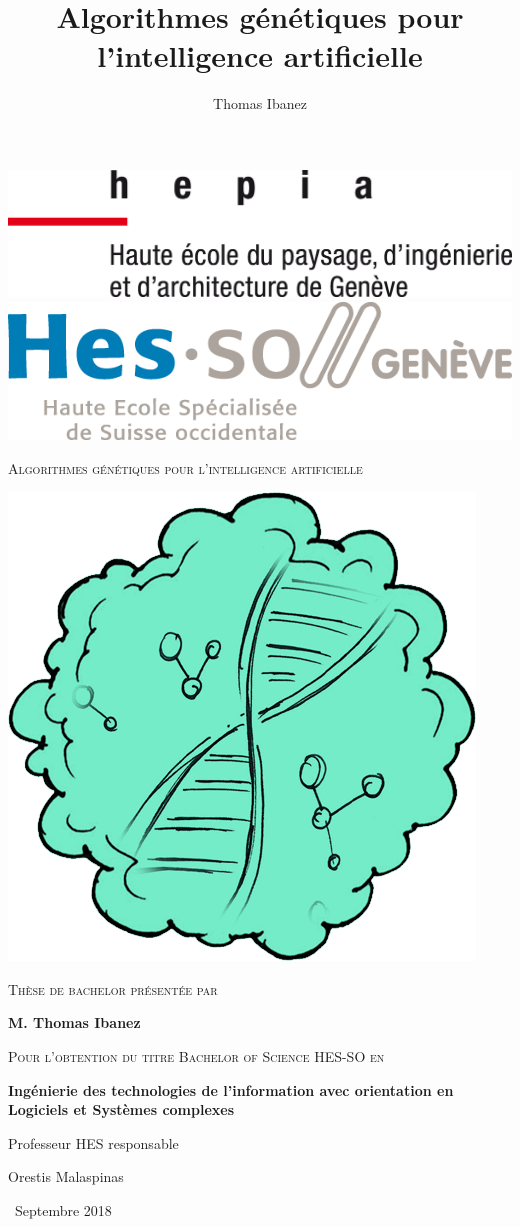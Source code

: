 \documentclass{article}
\title{Algorithmes génétiques pour l'intelligence artificielle}
\author{Thomas Ibanez}
\begin{document}
\begin{titlepage}
	\vspace*{-3cm}
		\includegraphics[width=.3\linewidth]{hepia.png}
		\hfill
		\includegraphics[width=.3\linewidth]{hes.png}\par
	\vspace{1cm}
	\centering
	{\scshape\huge Algorithmes génétiques pour l'intelligence artificielle \par}
	\vspace{1cm}
	\includegraphics[scale=0.4]{logo.png}\par
	\vspace{1.5cm}
	{\Large\scshape Thèse de bachelor présentée par\par}
	\vspace{0.5cm}
	{\bfseries\Large M. Thomas Ibanez\par}
	\vspace{0.8cm}
	{\scshape\Large Pour l'obtention du titre Bachelor of Science HES-SO en\par}
	\vspace{0.5cm}
	{\bfseries\Large Ingénierie des technologies de l'information avec orientation en Logiciels et Systèmes complexes\par}
	\vfill
	Professeur HES responsable\par
	\bfseries{Orestis Malaspinas\par}

	\vfill

	{\large\ Septembre 2018 \par}
\end{titlepage}
\end{document}
